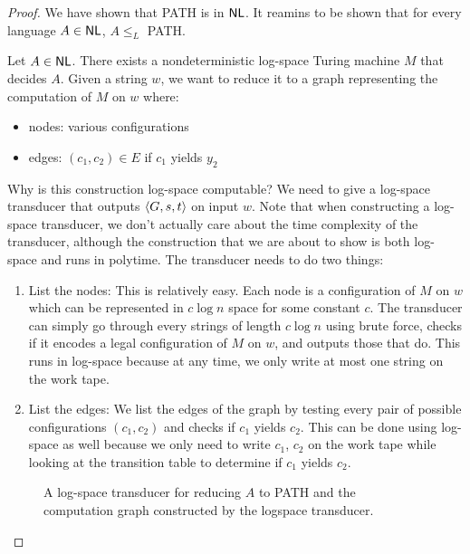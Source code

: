 \begin{proof}
    We have shown that PATH is in $\mathsf{NL}$. It reamins to be shown that for every language $A \in \mathsf{NL}$, $A \leq_L$ PATH.

    Let $A \in \mathsf{NL}$. There exists a nondeterministic log-space Turing machine $M$ that decides $A$. Given a string $w$, we want to reduce it to a graph representing the computation of $M$ on $w$ where:
    \begin{itemize}
        \item nodes: various configurations
        \item edges: $(c_1,c_2) \in E$ if $c_1$ yields $y_2$  
    \end{itemize}
    Why is this construction log-space computable? We need to give a log-space transducer that outputs $\langle G,s,t \rangle$ on input $w$. Note that when constructing a log-space transducer, we don't actually care about the time complexity of the transducer, although the construction that we are about to show is both log-space and runs in polytime. The transducer needs to do two things:

    \begin{enumerate}
        \item List the nodes: This is relatively easy. Each node is a configuration of $M$ on $w$ which can be represented in $c \log n$ space for some constant $c$. The transducer can simply go through every strings of length $c \log n$ using brute force, checks if it encodes a legal configuration of $M$ on $w$, and outputs those that do. This runs in log-space because at any time, we only write at most one string on the work tape.
        \item List the edges: We list the edges of the graph by testing every pair of possible configurations $(c_1,c_2)$ and checks if $c_1$ yields $c_2$. This can be done using log-space as well because we only need to write $c_1$, $c_2$ on the work tape while looking at the transition table to determine if $c_1$ yields $c_2$.
    \end{enumerate}

    \begin{figure}[htbp]
        \centering
        \qquad
        \caption{A log-space transducer for reducing $A$ to PATH and the computation graph constructed by the logspace transducer.}
        \label{fig:logspace-transducer-path}
    \end{figure}
\end{proof}

